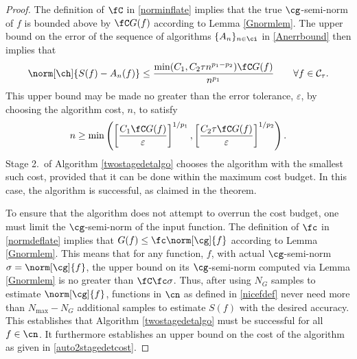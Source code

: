 \documentclass[final]{elsarticle}
\newcommand{\cc}{\mathcal{C}}
\theoremstyle{definition}
\theoremstyle{remark}
\begin{document}
\begin{proof} The definition of $\fC$ in \eqref{norminflate} implies that the true $\cg$-semi-norm of $f$ is bounded above by $\fC G(f)$ according to Lemma \ref{Gnormlem}.  The upper bound on the error of the sequence of algorithms $\{A_n\}_{n \in \ci}$ in \eqref{Anerrbound} then implies that 
\[
\norm[\ch]{S(f) -  A_n(f)} \le \frac{\min(C_1,C_2\tau n^{p_1-p_2})\fC G(f)}{n^{p_1}} \qquad \forall f \in \cc_{\tau}.
\]
This upper bound may be made no greater than the error tolerance, $\varepsilon$, by choosing the algorithm cost, $n$, to satisfy
\[
n \ge \min\left( \left[\frac{C_1 \fC G(f)}{\varepsilon}\right]^{1/p_1}, \left[\frac{C_2 \tau \fC G(f)}{\varepsilon}\right]^{1/p_2} \right ) .
\]
Stage 2.\ of Algorithm \ref{twostagedetalgo} chooses the algorithm with the smallest such cost, provided that it can be done within the maximum cost budget.  In this case, the algorithm is successful, as claimed in the theorem.

To ensure that the algorithm does not attempt to overrun the cost budget, one must limit the $\cg$-semi-norm of the input function.  The definition of  $\fc$ in \eqref{normdeflate} implies that $G(f) \le \fc\norm[\cg]{f}$ according to Lemma \ref{Gnormlem}. This means that for any function, $f$, with actual $\cg$-semi-norm $\sigma=\norm[\cg]{f}$, the upper bound on its $\cg$-semi-norm computed via Lemma \ref{Gnormlem} is no greater than $\fC \fc \sigma$.  Thus, after using $N_G$ samples to estimate $\norm[\cg]{f}$, functions in $\cn$ as defined in \eqref{nicefdef} never need more than $N_{\max} - N_G$ additional samples to estimate $S(f)$ with the desired accuracy.  This establishes that Algorithm \ref{twostagedetalgo} must be successful for all $f \in \cn$.  It furthermore establishes an upper bound on the cost of the algorithm as given in \eqref{auto2stagedetcost}.


\end{proof}
\end{document}
